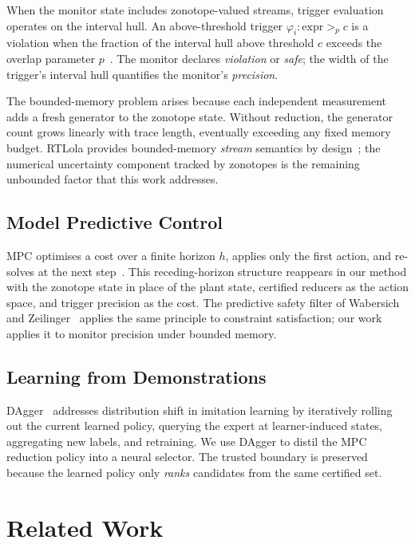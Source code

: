 \documentclass{article}
\begin{document}
When the monitor state includes zonotope-valued streams, trigger evaluation operates on the interval hull.
An above-threshold trigger $\varphi_i\colon \mathrm{expr} >_p c$ is a violation when the fraction of the interval hull above threshold $c$ exceeds the overlap parameter $p$~\cite{Finkbeiner2025}.
The monitor declares \emph{violation} or \emph{safe}; the width of the trigger's interval hull quantifies the monitor's \emph{precision}.

The bounded-memory problem arises because each independent measurement adds a fresh generator to the zonotope state.
Without reduction, the generator count grows linearly with trace length, eventually exceeding any fixed memory budget.
RTLola provides bounded-memory \emph{stream} semantics by design~\cite{RTLola2026}; the numerical uncertainty component tracked by zonotopes is the remaining unbounded factor that this work addresses.

\subsection{Model Predictive Control}\label{sec:bg-mpc}

MPC optimises a cost over a finite horizon $h$, applies only the first action, and re-solves at the next step~\cite{Mayne2005}.
This receding-horizon structure reappears in our method with the zonotope state in place of the plant state, certified reducers as the action space, and trigger precision as the cost.
The predictive safety filter of Wabersich and Zeilinger~\cite{WabersichZeilinger2021} applies the same principle to constraint satisfaction; our work applies it to monitor precision under bounded memory.

\subsection{Learning from Demonstrations}\label{sec:bg-dagger}

DAgger~\cite{Ross2011} addresses distribution shift in imitation learning by iteratively rolling out the current learned policy, querying the expert at learner-induced states, aggregating new labels, and retraining.
We use DAgger to distil the MPC reduction policy into a neural selector.
The trusted boundary is preserved because the learned policy only \emph{ranks} candidates from the same certified set.


\section{Related Work}\label{sec:related}
\end{document}
